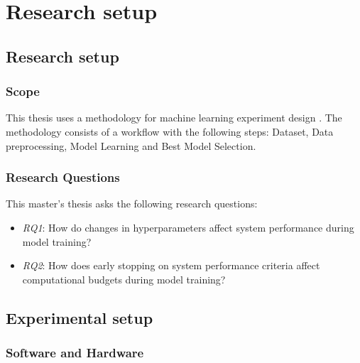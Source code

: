 \chapter{Research setup}
\label{chap:methods}

\section{Research setup}
\subsection{Scope}





This thesis uses a methodology for machine learning experiment design \parencite{fernandez-lozanoMethodologyDesignExperiments2016}. The methodology consists of a workflow with the following steps: Dataset, Data preprocessing, Model Learning and Best Model Selection. 


\subsection{Research Questions}
This master's thesis asks the following research questions:
\begin{itemize}
    \item \emph{RQ1}: How do changes in hyperparameters affect system performance during model training?
    \item \emph{RQ2}: How does early stopping on system performance criteria affect computational budgets during model training?
          
\end{itemize}

\section{Experimental setup}

\subsection{Software and Hardware}

